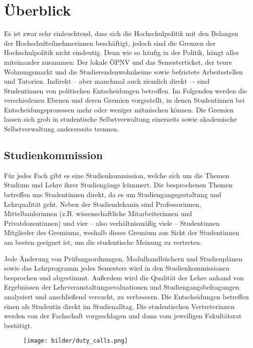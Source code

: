 \section{Überblick}
\label{hopo}



Es ist zwar sehr einleuchtend, dass sich die Hochschulpolitik mit den Belangen der Hochschulteilnehmerinnen beschäftigt, jedoch sind die Grenzen der Hochschulpolitik nicht eindeutig. Denn wie so häufig in der Politik, hängt alles miteinander zusammen: Der lokale ÖPNV und das Semesterticket, der teure Wohnungsmarkt und die Studierendenwohnheime sowie befristete Arbeitsstellen und Tutorien. Indirekt -- aber manchmal auch ziemlich direkt –- sind Studentinnen von politischen Entscheidungen betroffen. Im Folgenden werden die verschiedenen Ebenen und deren Gremien vorgestellt, in denen Studentinnen bei Entscheidungsprozessen mehr oder weniger mitmischen können. Die Gremien lassen sich grob in studentische Selbstverwaltung einerseits sowie akademische Selbstverwaltung andererseits trennen.


\subsection{Studienkommission}
Für jedes Fach gibt es eine Studien\-kom\-mis\-sion, welche sich um die Themen Studium und Lehre ihrer Studiengänge kümmert. Die besprochenen Themen betreffen uns Studentinnen direkt, da es um Studiengangsgestaltung und Lehrqualität geht. Neben der Studiendekanin sind Professorinnen, Mittelbaulerinnen (z.B. wissenschaftliche Mitarbeiterinnen und Privatdozentinnen) und vier -- also verhältnismäßig viele -- Studentinnen Mitglieder des Gremiums, weshalb dieses Gremium aus Sicht der Studentinnen am besten geeignet ist, um die studentische Meinung zu vertreten.

Jede Änderung von Prüfungsordnungen, Modulhandbüchern und Studienplänen sowie das Lehrprogramm jedes Semesters wird in den Studienkommissionen besprochen und abgestimmt. Außerdem wird die Qualität der Lehre anhand von Ergebnissen der Lehrveranstaltungsevaluationen und Studiengangsbefragungen analysiert und anschließend versucht, zu verbessern. Die Entscheidungen betreffen einen als Studentin direkt im Studienalltag. Die studentischen Vertreterinnen werden von der Fachschaft vorgeschlagen und dann vom jeweiligen Fakultätsrat bestätigt.

\begin{figure}[b]
    \centering
    \texttt{[image: bilder/duty\_calls.png]}
\end{figure}

